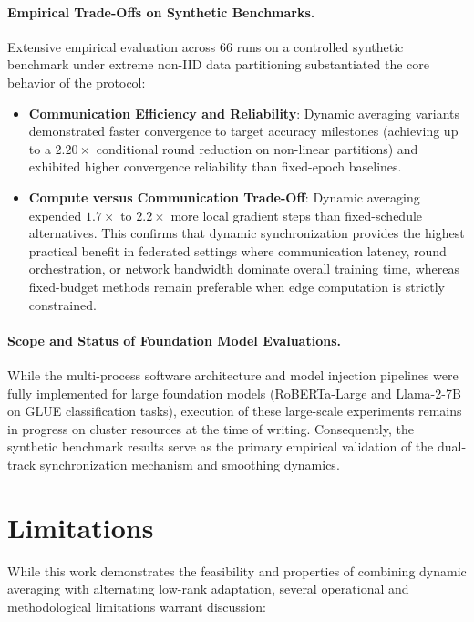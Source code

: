 \paragraph{Empirical Trade-Offs on Synthetic Benchmarks.}
Extensive empirical evaluation across 66 runs on a controlled synthetic benchmark under extreme non-IID data partitioning substantiated the core behavior of the protocol:
\begin{itemize}
    \item \textbf{Communication Efficiency and Reliability}: Dynamic averaging variants demonstrated faster convergence to target accuracy milestones (achieving up to a $2.20\times$ conditional round reduction on non-linear partitions) and exhibited higher convergence reliability than fixed-epoch baselines.
    \item \textbf{Compute versus Communication Trade-Off}: Dynamic averaging expended $1.7\times$ to $2.2\times$ more local gradient steps than fixed-schedule alternatives. This confirms that dynamic synchronization provides the highest practical benefit in federated settings where communication latency, round orchestration, or network bandwidth dominate overall training time, whereas fixed-budget methods remain preferable when edge computation is strictly constrained.
\end{itemize}

\paragraph{Scope and Status of Foundation Model Evaluations.}
While the multi-process software architecture and model injection pipelines were fully implemented for large foundation models (RoBERTa-Large and Llama-2-7B on GLUE classification tasks), execution of these large-scale experiments remains in progress on cluster resources at the time of writing. Consequently, the synthetic benchmark results serve as the primary empirical validation of the dual-track synchronization mechanism and smoothing dynamics.

\section{Limitations}
\label{sec:limitations}

While this work demonstrates the feasibility and properties of combining dynamic averaging with alternating low-rank adaptation, several operational and methodological limitations warrant discussion:

